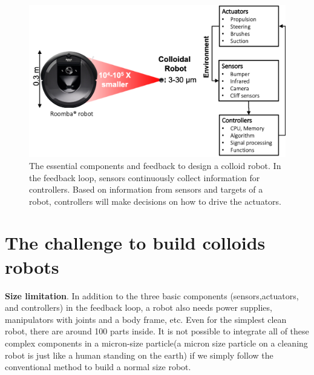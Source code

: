 \begin{figure}
\centering
\includegraphics[width=12cm]{figures/1_2.png}
\caption{The essential components and feedback to design a colloid robot. In the feedback loop, sensors continuously collect information for controllers. Based on  information from sensors and targets of a robot, controllers will make decisions on how to drive the actuators.}
\label{fig:1.2}
\end{figure}

\section{The challenge to  build colloids robots}

\textbf{Size limitation}. In addition to the three basic components (sensors,actuators, and controllers) in the feedback loop, a robot also needs power supplies, manipulators with joints and a body frame, etc. Even for the simplest clean robot, there are around 100 parts inside. It is not possible to integrate all of these complex components in a micron-size particle(a micron size particle on a cleaning robot is just like a human standing on the earth)  if we simply follow the conventional method to build a normal size robot. 


